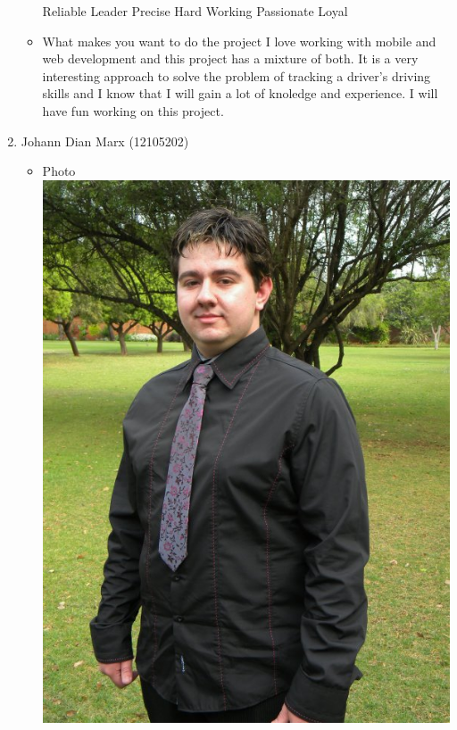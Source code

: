 \documentclass[12pt, oneside]{article}
\begin{document}
\begin{enumerate}
\begin{itemize}
Reliable\newline
Leader\newline
Precise\newline
Hard Working\newline
Passionate\newline
Loyal\newline
			\item What makes you want to do the project\newline\newline
				I love working with mobile and web development and this project has a mixture of both. It is a very interesting approach to solve the problem of tracking a driver's driving skills and I know that I will gain a lot of knoledge and experience. I will have fun working on this project. \newline
		\end{itemize}
		\item {Johann Dian Marx (12105202)\par}
		\begin{itemize}
			\item Photo\newline
				\includegraphics[scale=0.1]{Dian} %

\end{itemize}
\end{enumerate}
\end{document}

